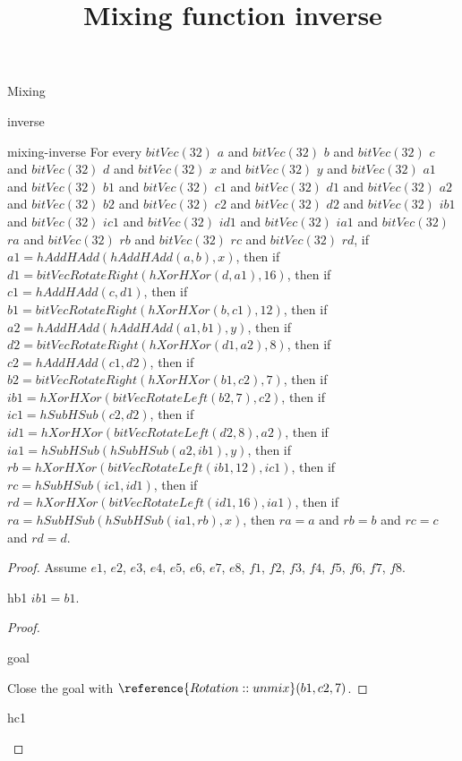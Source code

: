 \begin{lexlean}{Mixing}
\title{Mixing function inverse}

\begin{section}{inverse}
  \begin{theorem}{mixing-inverse}
  For every \(bitVec(32)\) \(a\) and \(bitVec(32)\) \(b\) and \(bitVec(32)\) \(c\) and \(bitVec(32)\) \(d\) and \(bitVec(32)\) \(x\) and \(bitVec(32)\) \(y\) and \(bitVec(32)\) \(a1\) and \(bitVec(32)\) \(b1\) and \(bitVec(32)\) \(c1\) and \(bitVec(32)\) \(d1\) and \(bitVec(32)\) \(a2\) and \(bitVec(32)\) \(b2\) and \(bitVec(32)\) \(c2\) and \(bitVec(32)\) \(d2\) and \(bitVec(32)\) \(ib1\) and \(bitVec(32)\) \(ic1\) and \(bitVec(32)\) \(id1\) and \(bitVec(32)\) \(ia1\) and \(bitVec(32)\) \(ra\) and \(bitVec(32)\) \(rb\) and \(bitVec(32)\) \(rc\) and \(bitVec(32)\) \(rd\), if \(a1 = hAddHAdd(hAddHAdd(a, b), x)\), then if \(d1 = bitVecRotateRight(hXorHXor(d, a1), 16)\), then if \(c1 = hAddHAdd(c, d1)\), then if \(b1 = bitVecRotateRight(hXorHXor(b, c1), 12)\), then if \(a2 = hAddHAdd(hAddHAdd(a1, b1), y)\), then if \(d2 = bitVecRotateRight(hXorHXor(d1, a2), 8)\), then if \(c2 = hAddHAdd(c1, d2)\), then if \(b2 = bitVecRotateRight(hXorHXor(b1, c2), 7)\), then if \(ib1 = hXorHXor(bitVecRotateLeft(b2, 7), c2)\), then if \(ic1 = hSubHSub(c2, d2)\), then if \(id1 = hXorHXor(bitVecRotateLeft(d2, 8), a2)\), then if \(ia1 = hSubHSub(hSubHSub(a2, ib1), y)\), then if \(rb = hXorHXor(bitVecRotateLeft(ib1, 12), ic1)\), then if \(rc = hSubHSub(ic1, id1)\), then if \(rd = hXorHXor(bitVecRotateLeft(id1, 16), ia1)\), then if \(ra = hSubHSub(hSubHSub(ia1, rb), x)\), then \(ra = a\) and \(rb = b\) and \(rc = c\) and \(rd = d\).
  \begin{proof}
  Assume \(e1\), \(e2\), \(e3\), \(e4\), \(e5\), \(e6\), \(e7\), \(e8\), \(f1\), \(f2\), \(f3\), \(f4\), \(f5\), \(f6\), \(f7\), \(f8\).
  \begin{have}{hb1}
  \(ib1 = b1\).
  \begin{proof}
  \begin{rewrite}{goal}
  \end{rewrite}
  Close the goal with \(\reference{Rotation::unmix}(b1, c2, 7)\).
  \end{proof}
  \end{have}
  \begin{have}{hc1}

\end{have}
\end{proof}
\end{theorem}
\end{section}
\end{lexlean}
